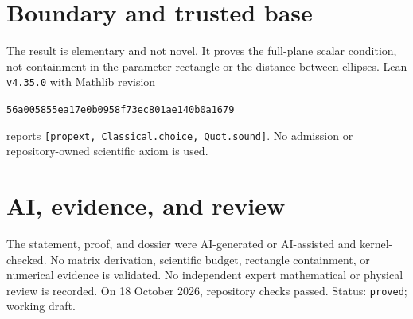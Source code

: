 \documentclass[11pt]{article}
\begin{document}
\section{Boundary and trusted base}
The result is elementary and not novel. It proves the full-plane scalar condition, not
containment in the parameter rectangle or the distance between ellipses. Lean
\texttt{v4.35.0} with Mathlib revision
\begin{center}\texttt{56a005855ea17e0b0958f73ec801ae140b0a1679}\end{center}
reports \texttt{[propext, Classical.choice, Quot.sound]}. No admission or
repository-owned scientific axiom is used.

\section{AI, evidence, and review}
The statement, proof, and dossier were AI-generated or AI-assisted and kernel-checked.
No matrix derivation, scientific budget, rectangle containment, or numerical evidence is
validated. No independent expert mathematical or physical review is recorded. On 18
October 2026, repository checks passed. Status: \texttt{proved}; working draft.
\end{document}
